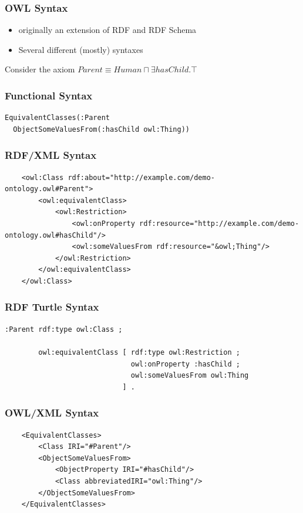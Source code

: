 \documentclass{beamer}
\begin{document}
\begin{frame}
  \frametitle{OWL Syntax}
  \begin{itemize}
  \item originally an extension of RDF and RDF Schema
  \item Several different (mostly) syntaxes
  \end{itemize}
  Consider the axiom $Parent \equiv Human \sqcap \exists hasChild.\top$
\end{frame}

\begin{frame}[fragile]
  \frametitle{Functional Syntax}
\begin{verbatim}
EquivalentClasses(:Parent 
  ObjectSomeValuesFrom(:hasChild owl:Thing))
\end{verbatim}
\end{frame}

\begin{frame}[fragile]
  \frametitle{RDF/XML Syntax}
{\tiny
\begin{verbatim}
    <owl:Class rdf:about="http://example.com/demo-ontology.owl#Parent">
        <owl:equivalentClass>
            <owl:Restriction>
                <owl:onProperty rdf:resource="http://example.com/demo-ontology.owl#hasChild"/>
                <owl:someValuesFrom rdf:resource="&owl;Thing"/>
            </owl:Restriction>
        </owl:equivalentClass>
    </owl:Class>
\end{verbatim}
}
\end{frame}

\begin{frame}[fragile]
  \frametitle{RDF Turtle Syntax}
{\tiny
\begin{verbatim}
:Parent rdf:type owl:Class ;
        
        owl:equivalentClass [ rdf:type owl:Restriction ;
                              owl:onProperty :hasChild ;
                              owl:someValuesFrom owl:Thing
                            ] .
\end{verbatim}
}
\end{frame}

\begin{frame}[fragile]
  \frametitle{OWL/XML Syntax}
{\tiny
\begin{verbatim}
    <EquivalentClasses>
        <Class IRI="#Parent"/>
        <ObjectSomeValuesFrom>
            <ObjectProperty IRI="#hasChild"/>
            <Class abbreviatedIRI="owl:Thing"/>
        </ObjectSomeValuesFrom>
    </EquivalentClasses>
\end{verbatim}
}
\end{frame}
\end{document}
